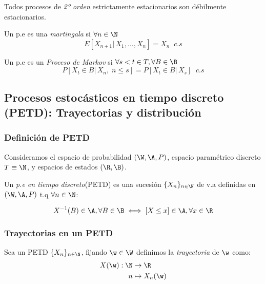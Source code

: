 \begin{nota}
  Todos procesos de \emph{2º orden} estrictamente estacionarios son débilmente estacionarios.
\end{nota}

\begin{ndef}
  Un p.e es una \emph{martingala} si $\forall n \in \N$ $$E[X_{n+1} | \, X_1, \ldots, X_n] = X_n \; \; c.s$$
\end{ndef}

\begin{ndef}
  Un p.e es un \emph{Proceso de Markov} si  $\forall s<t \in T, \forall B \in \B$ $$P[X_t \in B | \, X_n, \; n \leq s] = P[X_t \in B | \, X_s] \; \; c.s$$
\end{ndef}

\subsection{Procesos estocásticos en tiempo discreto (PETD): Trayectorias y distribución}

\subsubsection{Definición de PETD}

Consideramos el espacio de probabilidad $(\W, \A, P)$, espacio paramétrico discreto $T \equiv \N$, y espacios de estados $(\R, \B)$.

\begin{ndef}
  Un \emph{p.e en tiempo discreto}(PETD) es una sucesión $\{X_n\}_{n \in \N}$ de v.a definidas en $(\W, \A, P)$ t.q $\forall n \in \N$:

  $$X^{-1}(B) \in \A, \forall B \in \B \iff [X \leq x] \in \A, \forall x \in \R$$
\end{ndef}

\subsubsection{Trayectorias en un PETD}

\begin{ndef}
  Sea un PETD $\{X_n\}_{n \in \N}$, fijando $\w \in \W$ definimos la \emph{trayectoria} de $\w$ como:
  \begin{align*}
    X(\w): \N & \to \R \\
    n & \mapsto X_n(\w)
  \end{align*}

\end{ndef}

